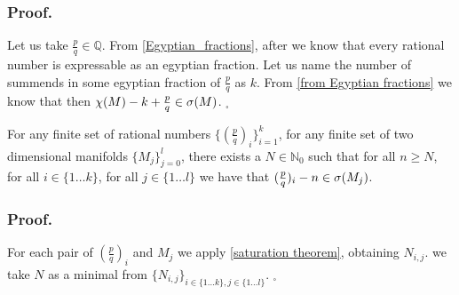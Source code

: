 \subsubsection{Proof.}
Let us take $\frac{p}{q} \in \mathbb{Q}$. 
From \ref{Egyptian_fractions}, after \cite{every number is expressible 
as an egyptian fraction} we know that every rational number is expressable as an egyptian 
fraction. Let us name the number of summends in some egyptian fraction of $\frac{p}{q}$ 
as $k$. From \ref{from Egyptian fractions} we know that then 
$\chi(M) - k + \frac{p}{q} \in {{\sigma}(M)}$.  $_\square$

\begin{corollary}\label{Saturation theorem corollary}
For any finite set of rational numbers $\{(\frac{p}{q})_i\}_{i=1}^k$, for any 
finite set of two dimensional manifolds $\{M_j\}_{j=0}^l$, there exists 
a $N\in\mathbb{N}_0$ such that 
for all $n \geq N$, for all $i\in \{1 \dots k\}$, 
for all $j\in\{1\dots l\}$ we have that  $(\frac{p}{q})_i - n \in {{\sigma}(M_j)}$.
\end{corollary}
\subsubsection{Proof.}
For each pair of $(\frac{p}{q})_i$ and $M_j$ we apply \ref{saturation theorem}, 
obtaining $N_{i,j}$. 
we take $N$ as a minimal from $\{N_{i,j}\}_{i\in\{1\dots k\}, j\in \{1\dots l\}}$. $_\square$ 

